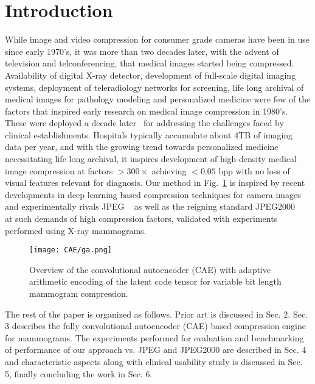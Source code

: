 \documentclass[10pt,twocolumn,letterpaper]{article}
\begin{document}
\section{Introduction}

While image and video compression for consumer grade cameras have been in use since early 1970's, it was more than two decades later, with the advent of television and telconferencing, that medical images started being compressed. Availability of digital X-ray detector, development of full-scale digital imaging systems, deployment of teleradiology networks for screening, life long archival of medical images for pathology modeling and personalized medicine were few of the factors that inspired early research on medical image compression in 1980's. These were deployed a decade later~\cite{kuduvalli1992performance} for addressing the challenges faced by clinical establishments. Hospitals typically accumulate about 4TB of imaging data per year, and with the growing trend towards personalized medicine necessitating life long archival, it inspires development of high-density medical image compression at factors $>300\times$ achieving $<0.05$ bpp with no loss of visual features relevant for diagnosis. Our method in Fig.~\ref{graphicalabstract} is inspired by recent developments in deep learning based compression techniques for camera images~\cite{toderici2016full, johnston2017improved, theis2017lossy, rippel2017real} and experimentally rivals JPEG ~\cite{wallace1992jpeg} as well as the reigning standard JPEG2000 ~\cite{skodras2001jpeg} at such demands of high compression factors, validated with experiments performed using X-ray mammograms.

\begin{figure}[t]
    \centering
       \texttt{[image: CAE/ga.png]}
  \caption{Overview of the convolutional autoencoder (CAE) with adaptive arithmetic encoding of the latent code tensor for variable bit length mammogram compression.}
  \label{graphicalabstract} 
\end{figure}

The rest of the paper is organized as follows. Prior art is discussed in Sec. 2. Sec. 3 describes the fully convolutional autoencoder (CAE) based compression engine for mammograms. The experiments performed for evaluation and benchmarking of performance of our approach vs. JPEG and JPEG2000 are described in Sec. 4 and characteristic aspects along with clinical usability study is discussed in Sec. 5, finally concluding the work in Sec. 6.
\end{document}
